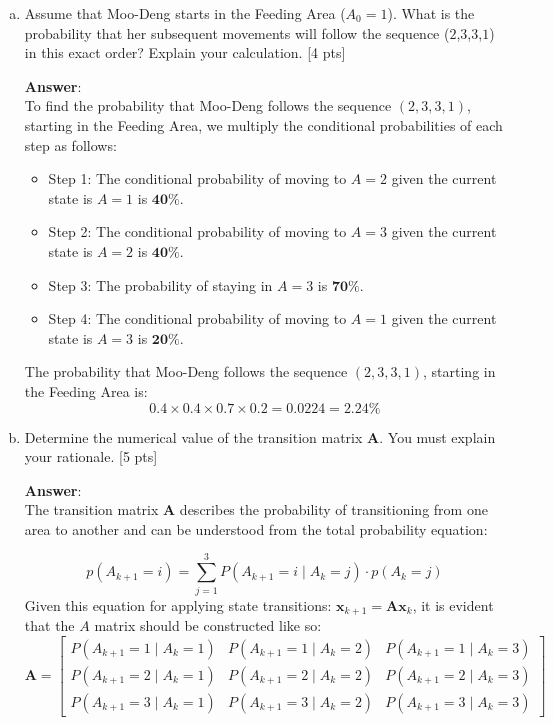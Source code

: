 \begin{enumerate}[a)]
    \item Assume that Moo-Deng starts in the Feeding Area ($A_0=1$). What is the probability that her subsequent movements will follow the sequence ($2$,$3$,$3$,$1$) in this exact order? Explain your calculation. [4 pts]
    
    \textbf{Answer}: \\
    To find the probability that Moo-Deng follows the sequence $(2, 3, 3, 1)$, starting in the Feeding Area, we multiply the conditional probabilities of each step as follows:
    
    \begin{itemize}
        \item Step 1: The conditional probability of moving to \(A=2\) given the current state is \(A=1\) is \(\textbf{40}\%\).
        \item Step 2: The conditional probability of moving to \(A=3\) given the current state is \(A=2\) is \(\textbf{40}\%\).
        \item Step 3: The probability of staying in \(A=3\) is \(\textbf{70}\%\).
        \item Step 4: The conditional probability of moving to \(A=1\) given the current state is \(A=3\) is \(\textbf{20}\%\).
    \end{itemize}
    
    The probability that Moo-Deng follows the sequence $(2, 3, 3, 1)$, starting in the Feeding Area is:
    \[
    0.4 \times 0.4 \times 0.7 \times 0.2 = 0.0224 = \bm{2.24\%}
    \]
    \item Determine the numerical value of the transition matrix $\mathbf{A}$. You must explain your rationale. [5 pts]
    
    \textbf{Answer}: \\
    The transition matrix $\mathbf{A}$ describes the probability of transitioning from one area to another and can be understood from the total probability equation:

    \[
    p(A_{k+1} = i) = \sum_{j=1}^3 P(A_{k+1} = i \mid A_k = j) \cdot p(A_k = j)
    \]
    Given this equation for applying state transitions: $\mathbf{x}_{k+1}=\mathbf{A}\mathbf{x}_{k}$, it is evident that the $A$ matrix should be constructed like so:
    \[
    \mathbf{A} = \begin{bmatrix}
    P(A_{k+1}=1 \mid A_k=1) & P(A_{k+1}=1 \mid A_k=2) & P(A_{k+1}=1 \mid A_k=3) \\
    P(A_{k+1}=2 \mid A_k=1) & P(A_{k+1}=2 \mid A_k=2) & P(A_{k+1}=2 \mid A_k=3) \\
    P(A_{k+1}=3 \mid A_k=1) & P(A_{k+1}=3 \mid A_k=2) & P(A_{k+1}=3 \mid A_k=3)
    \end{bmatrix}
    \]


\end{enumerate}

